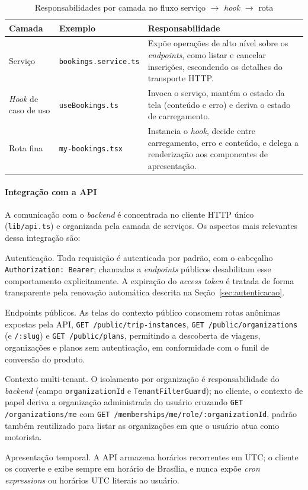 \begin{table}[H]
\centering
\caption{Responsabilidades por camada no fluxo serviço $\rightarrow$ \textit{hook} $\rightarrow$ rota}
\label{tab:fe_camadas}
{\footnotesize
\setlength{\tabcolsep}{4pt}
\begin{tabularx}{\textwidth}{@{}>{\raggedright\arraybackslash}p{2.8cm} >{\raggedright\arraybackslash}p{4.7cm} X@{}}
\toprule
\textbf{Camada} & \textbf{Exemplo} & \textbf{Responsabilidade} \\
\midrule
Serviço &
\texttt{bookings.service.ts} &
Expõe operações de alto nível sobre os \textit{endpoints}, como listar e cancelar inscrições, escondendo os detalhes do transporte HTTP. \\
\addlinespace
\textit{Hook} de caso de uso &
\texttt{useBookings.ts} &
Invoca o serviço, mantém o estado da tela (conteúdo e erro) e deriva o estado de carregamento. \\
\addlinespace
Rota fina &
\texttt{my-bookings.tsx} &
Instancia o \textit{hook}, decide entre carregamento, erro e conteúdo, e delega a renderização aos componentes de apresentação. \\
\bottomrule
\end{tabularx}
}
\end{table}

\paragraph{Integração com a API}

A comunicação com o \textit{backend} é concentrada no cliente HTTP único (\texttt{lib/api.ts}) e organizada pela camada de serviços. Os aspectos mais relevantes dessa integração são:

Autenticação. Toda requisição é autenticada por padrão, com o cabeçalho \texttt{Authorization: Bearer}; chamadas a \textit{endpoints} públicos desabilitam esse comportamento explicitamente. A expiração do \textit{access token} é tratada de forma transparente pela renovação automática descrita na Seção~\ref{sec:autenticacao}.

Endpoints públicos. As telas do contexto público consomem rotas anônimas expostas pela API, \texttt{GET /public/trip-instances}, \texttt{GET /public/organizations} (e \texttt{/:slug}) e \texttt{GET /public/plans}, permitindo a descoberta de viagens, organizações e planos sem autenticação, em conformidade com o funil de conversão do produto.

Contexto multi-tenant. O isolamento por organização é responsabilidade do \textit{backend} (campo \texttt{organizationId} e \texttt{TenantFilterGuard}); no cliente, o contexto de papel deriva a organização administrada do usuário cruzando \texttt{GET /organizations/me} com \texttt{GET /memberships/me/role/:organizationId}, padrão também reutilizado para listar as organizações em que o usuário atua como motorista.

Apresentação temporal. A API armazena horários recorrentes em UTC; o cliente os converte e exibe sempre em horário de Brasília, e nunca expõe \textit{cron expressions} ou horários UTC literais ao usuário.
